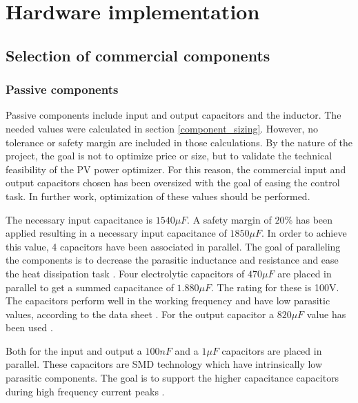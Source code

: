 
\chapter{Hardware implementation} \label{ch:hardware_implementation}


\section{Selection of commercial components}

\subsection{Passive components}

Passive components include input and output capacitors and the inductor. The needed values were calculated in section \ref{component_sizing}. However, no tolerance or safety margin are included in those calculations. By the nature of the project, the goal is not to optimize price or size, but to validate the technical feasibility of the PV power optimizer. For this reason, the commercial input and output capacitors chosen has been oversized with the goal of easing the control task. In further work, optimization of these values should be performed.

The necessary input capacitance is $1540 \mu F$. A safety margin of $20 \%$ has been applied resulting in a necessary input capacitance of $1850 \mu F$. In order to achieve this value, 4 capacitors have been associated in parallel. The goal of paralleling the components is to decrease the parasitic inductance and resistance and ease the heat dissipation task . Four electrolytic capacitors of $470\mu F$ \cite{cin} are placed in parallel to get a summed capacitance of $1.880\mu F$. The rating for these is 100V. The capacitors perform well in the working frequency and have low parasitic values, according to the data sheet \cite{cin}. For the output capacitor a $820\mu F$ value has been used \cite{cout}. 

Both for the input and output a $100nF$ and a $1\mu F$ capacitors are placed in parallel. These capacitors are SMD technology which have intrinsically low parasitic components. The goal is to support the higher capacitance capacitors during high frequency current peaks .

